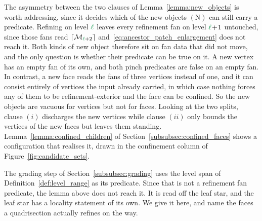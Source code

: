 \documentclass[a4paper, 12pt]{article}
\newcommand{\green}{\color{ForestGreen}}
\renewcommand{\l}{{\green\ell}}
\newcommand{\M}{\mathcal{M}}
\theoremstyle{definition}
\theoremstyle{plain}
\numberwithin{equation}{section}
\newcommand{\ancestorPatch}[1]{\lceil #1 \rceil}
\begin{document}
The asymmetry between the two clauses of Lemma~\ref{lemma:new_objects} is worth addressing, since it decides which of the new objects $(\mathrm{N})$ can still carry a predicate. Refining on level $\l$ leaves every refinement fan on level $\l\!+\!1$ untouched, since those fans read $\ancestorPatch{\M_{\l+2}}$ and~\eqref{eq:ancestor_patch_enlargement} does not reach it. Both kinds of new object therefore sit on fan data that did not move, and the only question is whether their predicate can be true on it. A new vertex has an empty fan of its own, and both pinch predicates are false on an empty fan. In contrast, a new face reads the fans of three vertices instead of one, and it can consist entirely of vertices the input already carried, in which case nothing forces any of them to be refinement-exterior and the face can be confined. So the new objects are vacuous for vertices but not for faces. Looking at the two splits, clause $(i)$ discharges the new vertices while clause $(ii)$ only bounds the vertices of the new faces but leaves them standing. Lemma~\ref{lemma:confined_children} of Section~\ref{subsubsec:confined_faces} shows a configuration that realises it, drawn in the confinement column of Figure~\ref{fig:candidate_sets}.

\smallskip

The grading step of Section~\ref{subsubsec:grading} uses the level span of Definition~\ref{def:level_range} as its predicate. Since that is not a refinement fan predicate, the lemma above does not reach it. It is read off the leaf star, and the leaf star has a locality statement of its own. We give it here, and name the faces a quadrisection actually refines on the way.
\end{document}
